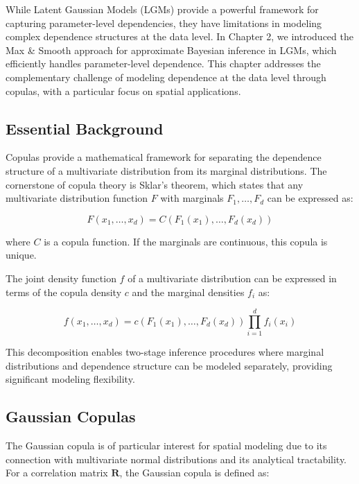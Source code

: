 

While Latent Gaussian Models (LGMs) provide a powerful framework for capturing parameter-level dependencies, they have limitations in modeling complex dependence structures at the data level. In Chapter 2, we introduced the Max \& Smooth approach for approximate Bayesian inference in LGMs, which efficiently handles parameter-level dependence. This chapter addresses the complementary challenge of modeling dependence at the data level through copulas, with a particular focus on spatial applications.

\subsection{Essential Background}

Copulas provide a mathematical framework for separating the dependence structure of a multivariate distribution from its marginal distributions. The cornerstone of copula theory is Sklar's theorem, which states that any multivariate distribution function $F$ with marginals $F_1,\ldots,F_d$ can be expressed as:

\begin{equation}
F(x_1,\ldots,x_d) = C(F_1(x_1),\ldots,F_d(x_d))
\end{equation}

where $C$ is a copula function. If the marginals are continuous, this copula is unique.

The joint density function $f$ of a multivariate distribution can be expressed in terms of the copula density $c$ and the marginal densities $f_i$ as:

\begin{equation}
f(x_1,\ldots,x_d) = c(F_1(x_1),\ldots,F_d(x_d)) \prod_{i=1}^d f_i(x_i)
\end{equation}

This decomposition enables two-stage inference procedures where marginal distributions and dependence structure can be modeled separately, providing significant modeling flexibility.

\subsection{Gaussian Copulas}
The Gaussian copula is of particular interest for spatial modeling due to its connection with multivariate normal distributions and its analytical tractability. For a correlation matrix $\mathbf{R}$, the Gaussian copula is defined as:

